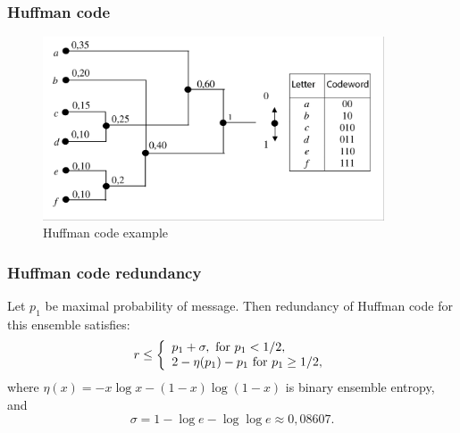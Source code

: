 \documentclass[14pt]{beamer}
\begin{document}
\begin{frame}
\frametitle{Huffman code}
\begin{itemize}    

\begin{figure}[ht]
\begin{minipage}{1.0\linewidth}
\includegraphics[width=0.9\textwidth]{fig2_4.png}
\caption{Huffman code example} \label{Huf_ex}
\end{minipage}
\end{figure}

\end{itemize}
\end{frame}


\begin{frame}
\frametitle{Huffman code redundancy}  

\begin{theorem} \label{th_huf_red}
Let $p_1 $ be maximal probability of message. Then redundancy of Huffman code for this ensemble satisfies:
    \begin{equation}
    \label{part2eq6} r \le \left\{ {{\begin{array}{*{20}c}
     {p_1 + \sigma ,\mbox{ for }p_1 < 1 / 2,} \hfill \\
     {2 - \eta(p_1 ) - p_1 \mbox{ for }p_1 \ge 1 / 2,} \hfill \\
    \end{array} }} \right.
    \end{equation}
    where $\eta(x) = - x\log x - (1 - x)\log (1 - x)$ is binary ensemble entropy, and
    \begin{equation}
    \label{part2eq7} \sigma = 1 - \log e - \log \log e \approx 0,08607.
    \end{equation}
    \end{theorem}
\end{frame}
\end{document}
